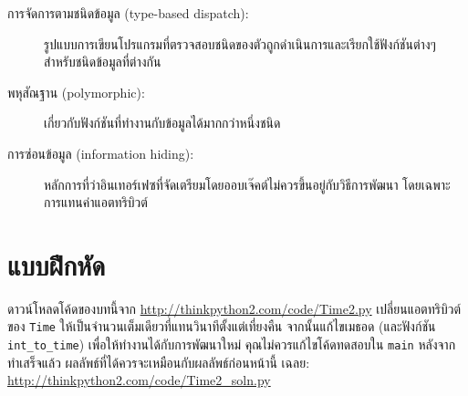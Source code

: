\begin{description}

\item[การจัดการตามชนิดข้อมูล (type-based dispatch):] รูปแบบการเขียนโปรแกรมที่ตรวจสอบชนิดของตัวถูกดำเนินการและเรียกใช้ฟังก์ชันต่างๆ สำหรับชนิดข้อมูลที่ต่างกัน

  
\item[พหุสัณฐาน (polymorphic):] เกี่ยวกับฟังก์ชันที่ทำงานกับข้อมูลได้มากกว่าหนึ่งชนิด



\item[การซ่อนข้อมูล (information hiding):] หลักการที่ว่าอินเทอร์เฟซที่จัดเตรียมโดยออบเจ๊คต์ไม่ควรขึ้นอยู่กับวิธีการพัฒนา โดยเฉพาะการแทนค่าแอตทริบิวต์

\end{description}


\section{แบบฝึกหัด}

\begin{exercise}


ดาวน์โหลดโค้ดของบทนี้จาก \url{http://thinkpython2.com/code/Time2.py} เปลี่ยนแอตทริบิวต์ของ {\tt Time} 
ให้เป็นจำนวนเต็มเดียวที่แทนวินาทีตั้งแต่เที่ยงคืน จากนั้นแก้ไขเมธอด (และฟังก์ชัน \verb"int_to_time") เพื่อให้ทำงานได้กับการพัฒนาใหม่
คุณไม่ควรแก้ไขโค้ดทดสอบใน {\tt main} หลังจากทำเสร็จแล้ว ผลลัพธ์ที่ได้ควรจะเหมือนกับผลลัพธ์ก่อนหน้านี้
เฉลย: \url{http://thinkpython2.com/code/Time2_soln.py}

\end{exercise}


